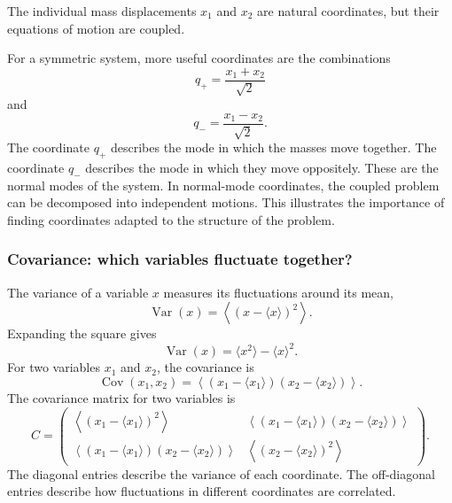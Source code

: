 The individual mass displacements $x_1$ and $x_2$ are natural coordinates, but their equations of motion are coupled.

For a symmetric system, more useful coordinates are the combinations
\[
    q_{+}=\frac{x_1+x_2}{\sqrt{2}}
\]
and
\[
    q_{-}=\frac{x_1-x_2}{\sqrt{2}}.
\]
The coordinate $q_{+}$ describes the mode in which the masses move together.
The coordinate $q_{-}$ describes the mode in which they move oppositely.
These are the normal modes of the system.
In normal-mode coordinates, the coupled problem can be decomposed into independent motions.
This illustrates the importance of finding coordinates adapted to the structure of the problem.



\subsubsection{Covariance: which variables fluctuate together?}
\label{sec:covariance}


The variance of a variable $x$ measures its fluctuations around its mean,
\[
    \operatorname{Var}(x)=\left\langle\left(x-\langle x\rangle\right)^2\right\rangle.
\]
Expanding the square gives
\[
    \operatorname{Var}(x)=\langle x^2\rangle-\langle x\rangle^2.
\]
For two variables $x_1$ and $x_2$, the covariance is
\[
    \operatorname{Cov}(x_1,x_2)=\left\langle\left(x_1-\langle x_1\rangle\right)\left(x_2-\langle x_2\rangle\right)\right\rangle.
\]
The covariance matrix for two variables is
\[
    C=
    \begin{pmatrix}
        \left\langle\left(x_1-\langle x_1\rangle\right)^2\right\rangle &
        \left\langle\left(x_1-\langle x_1\rangle\right)\left(x_2-\langle x_2\rangle\right)\right\rangle \\
        \left\langle\left(x_1-\langle x_1\rangle\right)\left(x_2-\langle x_2\rangle\right)\right\rangle &
        \left\langle\left(x_2-\langle x_2\rangle\right)^2\right\rangle
    \end{pmatrix}.
\]
The diagonal entries describe the variance of each coordinate.
The off-diagonal entries describe how fluctuations in different coordinates are correlated.



